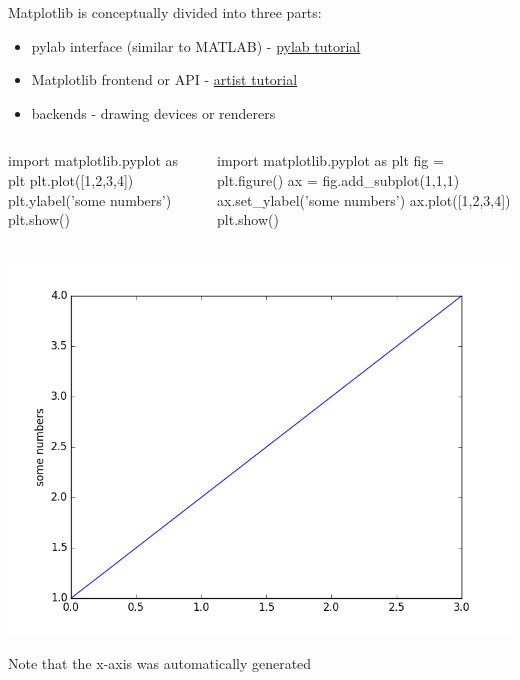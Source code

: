 \documentclass[xcolor=dvipsnames]{beamer}
\newcommand{\highlt}{\textcolor{myorange}}
\begin{document}
\begin{frame}[fragile]
\scriptsize

Matplotlib is conceptually divided into three parts:

\begin{itemize}
 \item \highlt{pylab} interface (similar to MATLAB) - \href{http://matplotlib.org/users/pyplot_tutorial.html#pyplot-tutorial}{pylab tutorial}
 \item \highlt{Matplotlib frontend} or API - \href{http://matplotlib.org/users/artists.html#artist-tutorial}{artist tutorial}
 \item \highlt{backends} - drawing devices or renderers 
\end{itemize}

\begin{columns}
 \begin{column}{5cm}
  \begin{code}
import matplotlib.pyplot as plt
plt.plot([1,2,3,4])
plt.ylabel('some numbers')
plt.show()
  \end{code}
 \end{column}
 \begin{column}{5cm}
\begin{code}
import matplotlib.pyplot as plt
fig = plt.figure()
ax = fig.add_subplot(1,1,1)
ax.set_ylabel('some numbers')
ax.plot([1,2,3,4])
plt.show()
  \end{code}
 \end{column}
\end{columns}

\begin{center}
  \includegraphics[scale=0.2]{simple.png}
\end{center}
\begin{flushleft}
 \tiny{Note that the x-axis was automatically generated} 
\end{flushleft}
\end{frame}
\end{document}
